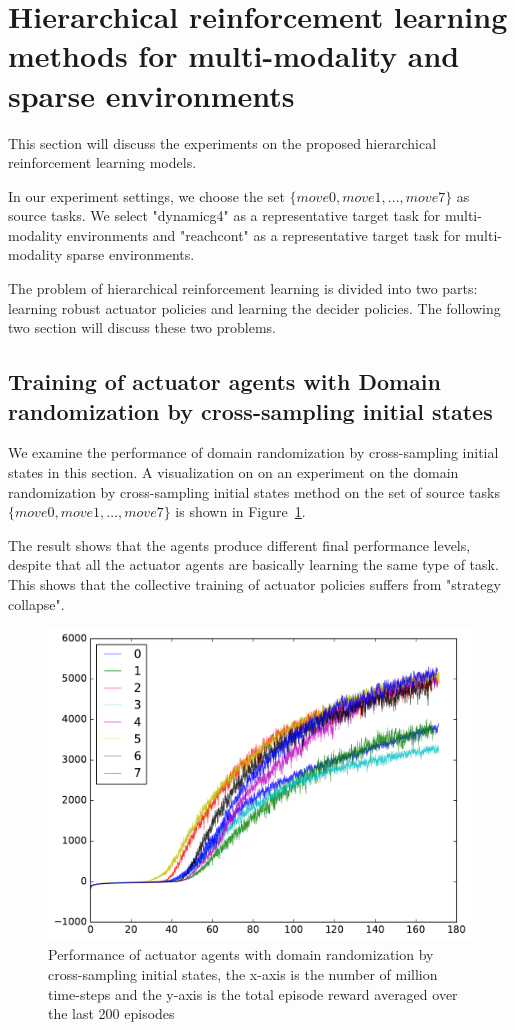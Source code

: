 
\section{Hierarchical reinforcement learning methods for multi-modality and sparse environments}
This section will discuss the experiments on the proposed hierarchical reinforcement learning models.

In our experiment settings, we choose the set $\{move0, move1, \dots, move7 \}$ as source tasks. We select "dynamicg4" as a representative target task for multi-modality environments and "reachcont" as a representative target task for multi-modality sparse environments.

The problem of hierarchical reinforcement learning is divided into two parts: learning robust actuator policies and learning the decider policies. The following two section will discuss these two problems.


\subsection{Training of actuator agents with Domain randomization by cross-sampling initial states}
We examine the performance of domain randomization by cross-sampling initial states in this section. A visualization on on an experiment on the domain randomization by cross-sampling initial states method on the set of source tasks $\{move0, move1, \dots, move7 \}$ is shown in Figure~\ref{rec_8task_training}.

The result shows that the agents produce different final performance levels, despite that all the actuator agents are basically learning the same type of task. This shows that the collective training of actuator policies suffers from "strategy collapse".

\begin{figure}[!htbp]
	\includegraphics[width=\textwidth]{images/rec_8task_training.pdf}
	\centering
	\caption{Performance of actuator agents with domain randomization by cross-sampling initial states, the x-axis is the number of million time-steps and the y-axis is the total episode reward averaged over the last 200 episodes}\label{rec_8task_training}
\end{figure}

